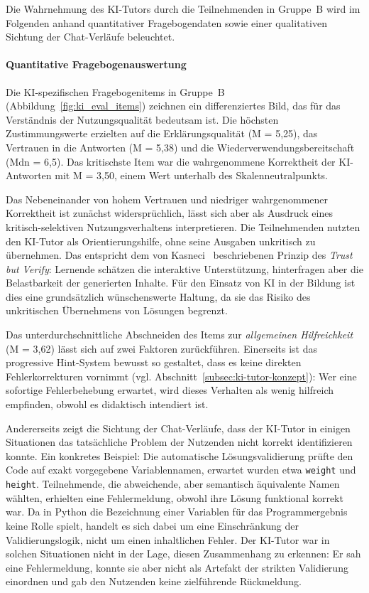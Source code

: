 Die Wahrnehmung des KI-Tutors durch die Teilnehmenden in Gruppe~B wird im Folgenden anhand quantitativer Fragebogendaten sowie einer qualitativen Sichtung der Chat-Verläufe beleuchtet.

\paragraph{Quantitative Fragebogenauswertung}

Die KI-spezifischen Fragebogenitems in Gruppe~B (Abbildung~\ref{fig:ki_eval_items}) zeichnen ein differenziertes Bild, das für das Verständnis der Nutzungsqualität bedeutsam ist. Die höchsten Zustimmungswerte erzielten auf die Erklärungsqualität (M = 5{,}25), das Vertrauen in die Antworten (M = 5{,}38) und die Wiederverwendungsbereitschaft (Mdn = 6{,}5). Das kritischste Item war die wahrgenommene Korrektheit der KI-Antworten mit M = 3{,}50, einem Wert unterhalb des Skalenneutralpunkts.

Das Nebeneinander von hohem Vertrauen und niedriger wahrgenommener Korrektheit ist zunächst widersprüchlich, lässt sich aber als Ausdruck eines kritisch-selektiven Nutzungsverhaltens interpretieren. Die Teilnehmenden nutzten den KI-Tutor als Orientierungshilfe, ohne seine Ausgaben unkritisch zu übernehmen. Das entspricht dem von Kasneci~\cite{kasneci2023} beschriebenen Prinzip des \textit{Trust but Verify}: Lernende schätzen die interaktive Unterstützung, hinterfragen aber die Belastbarkeit der generierten Inhalte. Für den Einsatz von KI in der Bildung ist dies eine grundsätzlich wünschenswerte Haltung, da sie das Risiko des unkritischen Übernehmens von Lösungen begrenzt.

Das unterdurchschnittliche Abschneiden des Items zur \textit{allgemeinen Hilfreichkeit} (M = 3{,}62) lässt sich auf zwei Faktoren zurückführen. Einerseits ist das progressive Hint-System bewusst so gestaltet, dass es keine direkten Fehlerkorrekturen vornimmt (vgl. Abschnitt~\ref{subsec:ki-tutor-konzept}): Wer eine sofortige Fehlerbehebung erwartet, wird dieses Verhalten als wenig hilfreich empfinden, obwohl es didaktisch intendiert ist. 

Andererseits zeigt die Sichtung der Chat-Verläufe, dass der KI-Tutor in einigen Situationen das tatsächliche Problem der Nutzenden nicht korrekt identifizieren konnte. Ein konkretes Beispiel: Die automatische Lösungsvalidierung prüfte den Code auf exakt vorgegebene Variablennamen, erwartet wurden etwa \texttt{weight} und \texttt{height}. Teilnehmende, die abweichende, aber semantisch äquivalente Namen wählten, erhielten eine Fehlermeldung, obwohl ihre Lösung funktional korrekt war. Da in Python die Bezeichnung einer Variablen für das Programmergebnis keine Rolle spielt, handelt es sich dabei um eine Einschränkung der Validierungslogik, nicht um einen inhaltlichen Fehler. Der KI-Tutor war in solchen Situationen nicht in der Lage, diesen Zusammenhang zu erkennen: Er sah eine Fehlermeldung, konnte sie aber nicht als Artefakt der strikten Validierung einordnen und gab den Nutzenden keine zielführende Rückmeldung. 

